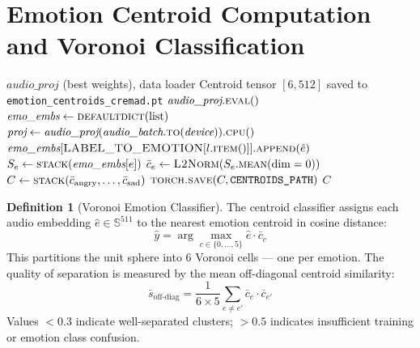 \documentclass[12pt,a4paper]{article}
\theoremstyle{definition}
\newtheorem{definition}[theorem]{Definition}
\theoremstyle{remark}
\begin{document}
\section{Emotion Centroid Computation and Voronoi Classification}

\begin{algorithm}[H]
\caption{Compute and Save CREMA-D Emotion Centroids}
\label{alg:centroids}
\begin{algorithmic}[1]
\Require $\textit{audio\_proj}$ (best weights), data loader
\Ensure Centroid tensor $[6, 512]$ saved to \texttt{emotion\_centroids\_cremad.pt}
\State $\textit{audio\_proj}.\textsc{eval}()$
\State $\textit{emo\_embs} \gets \textsc{defaultdict}(\text{list})$
  \State $\textit{proj} \gets \textit{audio\_proj}(\textit{audio\_batch}.\textsc{to}(\textit{device})).\textsc{cpu}()$
    \State $\textit{emo\_embs}[\textsc{LABEL\_TO\_EMOTION}[l.\textsc{item}()]].\textsc{append}(\hat{e})$
  \EndFor
\EndFor
{}
  \State $S_e \gets \textsc{stack}(\textit{emo\_embs}[e])$
         \Comment{$[N_e, 512]$}
  \State $\bar{c}_e \gets \textsc{L2Norm}(S_e.\textsc{mean}(\text{dim}=0))$
\EndFor
\State $C \gets \textsc{stack}(\bar{c}_{\text{angry}}, \ldots, \bar{c}_{\text{sad}})$
       \Comment{$[6, 512]$}
\State $\textsc{torch.save}(C, \texttt{CENTROIDS\_PATH})$
\State \Return $C$
\end{algorithmic}
\end{algorithm}

\begin{definition}[Voronoi Emotion Classifier]
The centroid classifier assigns each audio embedding $\hat{e} \in \mathbb{S}^{511}$
to the nearest emotion centroid in cosine distance:
\[
  \hat{y} = \arg\max_{c \in \{0,\ldots,5\}} \hat{e} \cdot \bar{c}_c
\]
This partitions the unit sphere into 6 Voronoi cells — one per emotion.
The quality of separation is measured by the mean off-diagonal centroid similarity:
\[
  \bar{s}_{\text{off-diag}} = \frac{1}{6 \times 5}\sum_{e \neq e'} \bar{c}_e \cdot \bar{c}_{e'}
\]
Values $< 0.3$ indicate well-separated clusters; $> 0.5$ indicates insufficient
training or emotion class confusion.
\end{definition}

\end{document}
